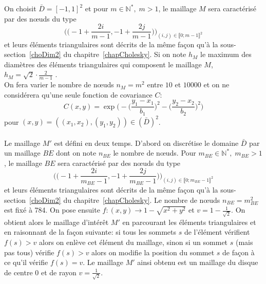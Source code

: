 On choisit $\bar{D}= [-1,1]^2$ et pour $m \in \mathbb{N}^{*}, \; m > 1$, le maillage $M$ sera caractérisé par des n\oe uds du type
\begin{equation*} \biggl (\biggl(-1 + \frac{2i}{m-1}, -1 + \frac{2j}{m-1} \biggr)\biggr)_{(i,j) \in \llbracket 0;m-1 \rrbracket^2}  \end{equation*}
et leurs éléments triangulaires sont décrits de la même façon qu'à la sous-section~\ref{choDim2} du chapitre~\ref{chapCholesky}.
Si on note $h_M$ le maximum des diamètres des éléments triangulaires qui composent le maillage $M$, $h_M = \sqrt{2} \cdot \frac{2}{m-1}$ .\\
On fera varier le nombre de n\oe uds $n_M = m^2$ entre $10$ et $10000$ et on ne considérera qu'une seule fonction de covariance $C$:
\begin{equation*} C(x,y) = \exp\biggl(-\biggl(\frac{y_1 - x_1}{b_1}\biggr)^2-\biggl(\frac{y_2 - x_2}{b_2}\biggr)^2\biggr) \end{equation*}
pour $(x,y)= ((x_1,x_2),(y_1,y_2)) \in (\bar{D})^2$.\\
~\\
Le maillage $M'$ est défini en deux temps. D'abord on discrétise le domaine $\bar{D}$ par un maillage $BE$ dont on
note $n_{BE}$ le nombre de n\oe uds. Pour $m_{BE} \in \mathbb{N}^{*}, \; m_{BE} > 1$, le maillage $BE$ sera caractérisé par des n\oe uds du type
\begin{equation*} \biggl (\biggl(-1 + \frac{2i}{m_{BE}-1}, -1 + \frac{2j}{m_{BE}-1} \biggr)\biggr)_{(i,j) \in \llbracket 0;m_{BE}-1 \rrbracket^2}  \end{equation*}
et leurs éléments triangulaires sont décrits de la même façon qu'à la sous-section~\ref{choDim2} du chapitre~\ref{chapCholesky}.
Le nombre de n\oe uds $n_{BE} = m_{BE}^2$ est fixé à 784.
On pose ensuite $f: (x,y)  \rightarrow 1 - \sqrt{x^2 + y^2}$ et $v=1 - \frac{1}{\sqrt{2}}$.
On obtient alors le maillage d'intérêt $M'$ en
parcourant les éléments triangulaires et en raisonnant de la façon suivante: si tous les sommets $s$
de l'élément vérifient $f(s)> v$ alors on enlève cet élément du maillage, sinon
si un sommet $s$ (mais pas tous) vérifie  $f(s)> v$ alors on modifie la position
du sommet $s$ de façon à ce qu'il vérifie $f(s) = v$.
Le maillage $M'$ ainsi obtenu est un maillage du disque de centre $0$ et de rayon $v = \frac{1}{\sqrt{2}}$.

